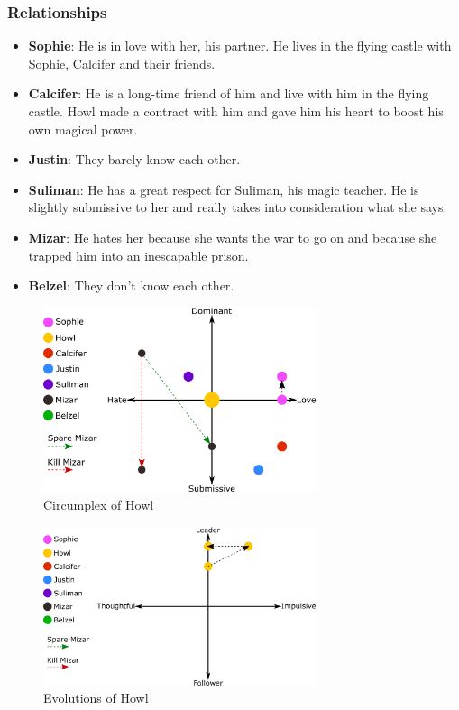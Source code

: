 \subsubsection*{Relationships}
\begin{itemize}
\item \textbf{Sophie}: He is in love with her, his partner. He lives in the flying castle with Sophie, Calcifer and their friends.
\item \textbf{Calcifer}: He is a long-time friend of him and live with him in the flying castle. Howl made a contract with him and gave him his heart to boost his own magical power.
\item \textbf{Justin}: They barely know each other.
\item \textbf{Suliman}: He has a great respect for Suliman, his magic teacher. He is slightly submissive to her and really takes into consideration what she says.
\item \textbf{Mizar}: He hates her because she wants the war to go on and because she trapped him into an inescapable prison.
\item \textbf{Belzel}: They don't know each other.
\end{itemize}

\begin{figure}[H]
  \centering
  \includegraphics[width=8cm]{Images/SVG/Exported/Circumplexes/howlCircumplex}
  \caption{Circumplex of Howl}
\end{figure}

\begin{figure}[H]
  \centering
  \includegraphics[width=8cm]{Images/SVG/Exported/Evolutions/howlEvolution}
  \caption{Evolutions of Howl}
\end{figure}


